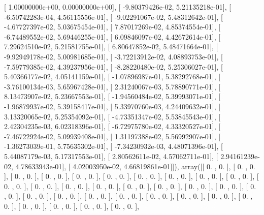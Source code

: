 \documentclass{article}
\begin{document}
       [  1.00000000e+00,   0.00000000e+00],
       [ -9.80379426e-02,   5.21135218e-01],
       [ -6.50742283e-04,   4.56115556e-01],
       [ -9.02291067e-02,   5.48312642e-01],
       [ -4.67727397e-02,   5.03675454e-01],
       [  7.87017269e-02,   4.85374554e-01],
       [ -6.74489552e-02,   5.69446255e-01],
       [  6.09846097e-02,   4.42672614e-01],
       [  7.29624510e-02,   5.21581755e-01],
       [  6.80647852e-02,   5.48471664e-01],
       [ -9.92949178e-02,   5.00981685e-01],
       [ -3.72213912e-02,   4.08893753e-01],
       [ -7.59779385e-02,   4.39237956e-01],
       [ -8.28220480e-02,   5.25306027e-01],
       [  5.40366177e-02,   4.05141159e-01],
       [ -1.07896987e-01,   5.38292768e-01],
       [ -3.76100134e-03,   5.65967428e-01],
       [  2.31240067e-03,   5.78890771e-01],
       [  8.13473907e-02,   5.23667553e-01],
       [ -1.94560484e-02,   5.39993071e-01],
       [ -1.96879937e-02,   5.39158417e-01],
       [  5.33970760e-03,   4.24409632e-01],
       [  3.13320065e-02,   5.25354092e-01],
       [ -4.73351347e-02,   5.53845543e-01],
       [  2.42304235e-03,   6.02318396e-01],
       [ -6.72975780e-02,   4.33320527e-01],
       [ -7.46722924e-02,   5.09939408e-01],
       [  1.31197388e-02,   5.56992907e-01],
       [ -1.36273039e-01,   5.75635302e-01],
       [ -7.34230932e-03,   4.48071396e-01],
       [  5.44087179e-03,   5.17317553e-01],
       [  2.80562611e-02,   4.57062711e-01],
       [  2.94161239e-02,   4.78633943e-01],
       [  4.02003950e-02,   4.66819861e-01]]), array([[ 0.        ,  0.        ],
       [ 0.        ,  0.        ],
       [ 0.        ,  0.        ],
       [ 0.        ,  0.        ],
       [ 0.        ,  0.        ],
       [ 0.        ,  0.        ],
       [ 0.        ,  0.        ],
       [ 0.        ,  0.        ],
       [ 0.        ,  0.        ],
       [ 0.        ,  0.        ],
       [ 0.        ,  0.        ],
       [ 0.        ,  0.        ],
       [ 0.        ,  0.        ],
       [ 0.        ,  0.        ],
       [ 0.        ,  0.        ],
       [ 0.        ,  0.        ],
       [ 0.        ,  0.        ],
       [ 0.        ,  0.        ],
       [ 0.        ,  0.        ],
       [ 0.        ,  0.        ],
       [ 0.        ,  0.        ],
       [ 0.        ,  0.        ],
       [ 0.        ,  0.        ],
       [ 0.        ,  0.        ],
       [ 0.        ,  0.        ],
       [ 0.        ,  0.        ],
       [ 0.        ,  0.        ],
       [ 0.        ,  0.        ],
       [ 0.        ,  0.        ],
       [ 0.        ,  0.        ],
       [ 0.        ,  0.        ],
\end{document}
